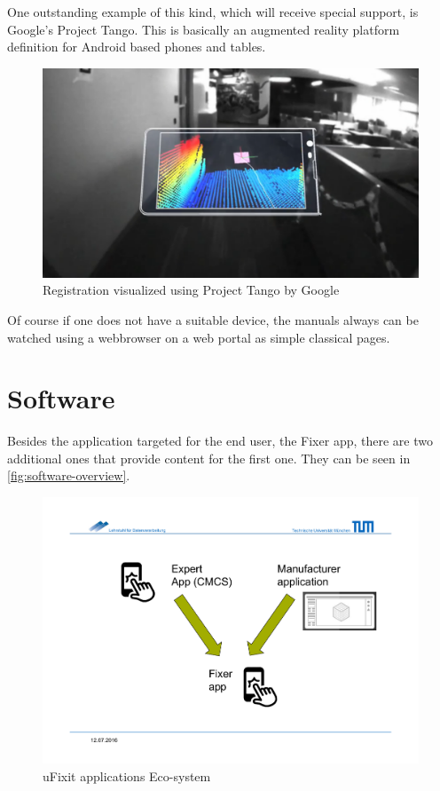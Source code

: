 		One outstanding example of this kind, which will receive special support, is Google's Project Tango. This is basically an augmented reality platform definition for Android based phones and tables.
		
		\begin{figure}[H]
			\centering
			\includegraphics[width=0.7\linewidth]{../images/project-tango}
			\caption{Registration visualized using Project Tango by Google}
			\label{fig:project-tango}
		\end{figure}
		
		Of course if one does not have a suitable device, the manuals always can be watched using a webbrowser on a web portal as simple classical pages.
		
	
	\section{Software}
		
		Besides the application targeted for the end user, the Fixer app, there are two additional ones that provide content for the first one. They can be seen in \autoref{fig:software-overview}.
		
		\begin{figure}[H]
			\includegraphics[width=\textwidth, trim=4cm 3cm 3cm 4cm, clip]{../images/software-overview.pdf}
			\centering
			\caption{uFixit applications Eco-system}
			\label{fig:software-overview}
		\end{figure}
		

